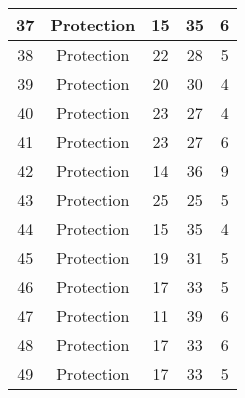 \documentclass[results.tex]{subfiles}
\begin{document}
\begin{center}
\begin{tabular}{| c || c | c | c | c |}
            \hline
            37                      & Protection                   & 15                     & 35                      & 6                    \\
            \hline
            38                      & Protection                   & 22                     & 28                      & 5                    \\
            \hline
            39                      & Protection                   & 20                     & 30                      & 4                    \\
            \hline
            40                      & Protection                   & 23                     & 27                      & 4                    \\
            \hline
            41                      & Protection                   & 23                     & 27                      & 6                    \\
            \hline
            42                      & Protection                   & 14                     & 36                      & 9                    \\
            \hline
            43                      & Protection                   & 25                     & 25                      & 5                    \\
            \hline
            44                      & Protection                   & 15                     & 35                      & 4                    \\
            \hline
            45                      & Protection                   & 19                     & 31                      & 5                    \\
            \hline
            46                      & Protection                   & 17                     & 33                      & 5                    \\
            \hline
            47                      & Protection                   & 11                     & 39                      & 6                    \\
            \hline
            48                      & Protection                   & 17                     & 33                      & 6                    \\
            \hline
            49                      & Protection                   & 17                     & 33                      & 5                    \\
            \hline
        \end{tabular}
    \end{center}
\end{document}
